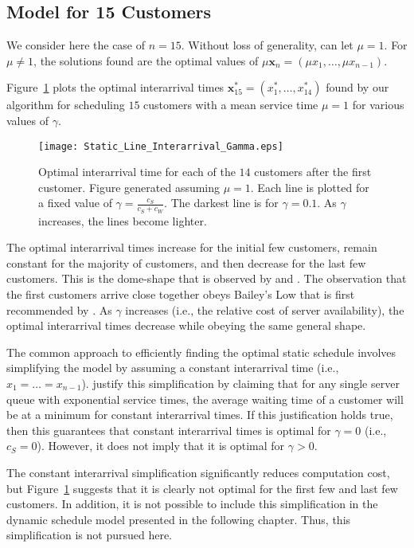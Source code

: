 \subsection{Model for 15 Customers}
We consider here the case of $n = 15$. Without loss of generality, can let $\mu = 1$. For $\mu \neq 1$, the solutions found are the optimal values of $\mu \mathbf{x}_{n} = (\mu x_{1}, \ldots, \mu x_{n - 1})$.

Figure~\ref{fig:Static_Time_Gamma} plots the optimal interarrival times $\mathbf{x}_{15}^{*} = (x_{1}^{*}, \ldots, x_{14}^{*})$ found by our algorithm for scheduling $15$ customers with a mean service time $\mu = 1$ for various values of $\gamma$.
\begin{figure}[htb]
	\centering
	\texttt{[image: Static\_Line\_Interarrival\_Gamma.eps]}
	\caption{Optimal interarrival time for each of the $14$ customers after the first customer. Figure generated assuming $\mu = 1$. Each line is plotted for a fixed value of $\gamma = \frac{c_{S}}{c_{S} + c_{W}}$. The darkest line is for $\gamma = 0.1$. As $\gamma$ increases, the lines become lighter.}
	\label{fig:Static_Time_Gamma}
\end{figure}

The optimal interarrival times increase for the initial few customers, remain constant for the majority of customers, and then decrease for the last few customers. This is the dome-shape that is observed by \citet{Stein} and \citet{Mendel}. The observation that the first customers arrive close together obeys Bailey's Low that is first recommended by \citet{Bailey}. As $\gamma$ increases (i.e., the relative cost of server availability), the optimal interarrival times decrease while obeying the same general shape.

The common approach to efficiently finding the optimal static schedule involves simplifying the model by assuming a constant interarrival time (i.e., $x_{1} = \ldots = x_{n - 1}$). \citet{Stein} justify this simplification by claiming that for any single server queue with exponential service times, the average waiting time of a customer will be at a minimum for constant interarrival times. If this justification holds true, then this guarantees that constant interarrival times is optimal for $\gamma = 0$ (i.e., $c_{S} = 0$). However, it does not imply that it is optimal for $\gamma > 0$.

The constant interarrival simplification significantly reduces computation cost, but Figure~\ref{fig:Static_Time_Gamma} suggests that it is clearly not optimal for the first few and last few customers. In addition, it is not possible to include this simplification in the dynamic schedule model presented in the following chapter. Thus, this simplification is not pursued here.

